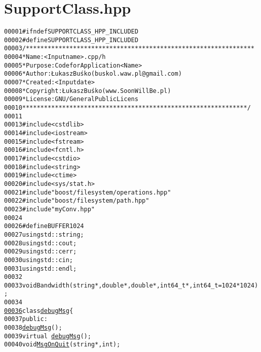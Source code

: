 \hypertarget{SupportClass_8hpp_source}{
\section{SupportClass.hpp}
}


\begin{footnotesize}\begin{alltt}
00001 \textcolor{preprocessor}{#ifndef SUPPORTCLASS\_HPP\_INCLUDED}
00002 \textcolor{preprocessor}{}\textcolor{preprocessor}{#define SUPPORTCLASS\_HPP\_INCLUDED}
00003 \textcolor{preprocessor}{}\textcolor{comment}{/***************************************************************}
00004 \textcolor{comment}{ * Name:      <Input name>.cpp/h}
00005 \textcolor{comment}{ * Purpose:   Code for Application <Name>}
00006 \textcolor{comment}{ * Author:    Łukasz Buśko (buskol.waw.pl@gmail.com)}
00007 \textcolor{comment}{ * Created:   <Input date>}
00008 \textcolor{comment}{ * Copyright: Łukasz Buśko (www.SoonWillBe.pl)}
00009 \textcolor{comment}{ * License:   GNU / General Public Licens}
00010 \textcolor{comment}{ **************************************************************/}
00011 
00013 \textcolor{preprocessor}{#include <cstdlib>}
00014 \textcolor{preprocessor}{#include <iostream>}
00015 \textcolor{preprocessor}{#include <fstream>}
00016 \textcolor{preprocessor}{#include <fcntl.h>}
00017 \textcolor{preprocessor}{#include <cstdio>}
00018 \textcolor{preprocessor}{#include <string>}
00019 \textcolor{preprocessor}{#include <ctime>}
00020 \textcolor{preprocessor}{#include <sys/stat.h>}
00021 \textcolor{preprocessor}{#include "boost/filesystem/operations.hpp"}
00022 \textcolor{preprocessor}{#include "boost/filesystem/path.hpp"}
00023 \textcolor{preprocessor}{#include "myConv.hpp"}
00024 
00026 \textcolor{preprocessor}{#define BUFFER 1024}
00027 \textcolor{preprocessor}{}\textcolor{keyword}{using} std::string;
00028 \textcolor{keyword}{using} std::cout;
00029 \textcolor{keyword}{using} std::cerr;
00030 \textcolor{keyword}{using} std::cin;
00031 \textcolor{keyword}{using} std::endl;
00032 
00033 \textcolor{keywordtype}{void} Bandwidth(\textcolor{keywordtype}{string} *,\textcolor{keywordtype}{double}*,\textcolor{keywordtype}{double}*,int64\_t *,int64\_t =1024*1024);
00034 
\hypertarget{SupportClass_8hpp_source_l00036}{}\hyperlink{classdebugMsg}{00036} \textcolor{keyword}{class }\hyperlink{classdebugMsg}{debugMsg}\{
00037     \textcolor{keyword}{public}:
00038         \hyperlink{classdebugMsg}{debugMsg}();
00039         \textcolor{keyword}{virtual} ~\hyperlink{classdebugMsg}{debugMsg}();
00040         \textcolor{keywordtype}{void} \hyperlink{classdebugMsg_a64167d8cd68ec044b211e9aeb4c34e76}{MsgOnQuit}(\textcolor{keywordtype}{string} *,\textcolor{keywordtype}{int});

\end{alltt}
\end{footnotesize}
